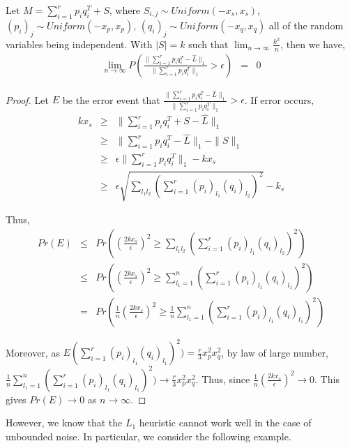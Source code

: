 \begin{prop}
Let $M=\sum_{i=1}^{r}p_{i}q_{i}^{T}+S$, where $S_{i,j}\sim Uniform(-x_{s},x_{s})$,
$(p_{i})_{j}\sim Uniform(-x_{p},x_{p})$, $(q_{i})_{j}\sim Uniform(-x_{q},x_{q})$
all of the random variables being independent. With $|S|=k$ such that
$\lim_{n\to\infty}\frac{k^{2}}{n}$, then we have,
\begin{eqnarray*}
\lim_{n\to\infty}P(\frac{\|\sum_{i=1}^{r}p_{i}q_{i}^{T}-\hat{L}\|_{1}}{\|\sum_{i=1}^{r}p_{i}q_{i}^{T}\|_{1}}>\epsilon) & = & 0
\end{eqnarray*}
\end{prop}
\begin{proof}
Let $E$ be the error event that $\frac{\|\sum_{i=1}^{r}p_{i}q_{i}^{T}-\hat{L}\|_{1}}{\|\sum_{i=1}^{r}p_{i}q_{i}^{T}\|_{1}}>\epsilon$.
If error occurs,
\begin{eqnarray*}
kx_{s} & \ge & \|\sum_{i=1}^{r}p_{i}q_{i}^{T}+S-\hat{L}\|_{1}\\
 & \ge & \|\sum_{i=1}^{r}p_{i}q_{i}^{T}-\hat{L}\|_{1}-\|S\|_{1}\\
 & \ge & \epsilon\|\sum_{i=1}^{r}p_{i}q_{i}^{T}\|_{1}-kx_{s}\\
 & \ge & \epsilon\sqrt{\sum_{l_{1}l_{2}}(\sum_{i=1}^{r}(p_{i})_{l_{1}}(q_{i})_{l_{2}})^{2}}-k_{s}
\end{eqnarray*}


Thus,
\begin{eqnarray*}
Pr(E)
&\le & Pr((\frac{2kx_{s}}{\epsilon})^{2}\ge\sum_{l_{1}l_{2}}(\sum_{i=1}^{r}(p_{i})_{l_{1}}(q_{i})_{l_{2}})^{2})\\
&\le & Pr((\frac{2kx_{s}}{\epsilon})^{2}\ge\sum_{l_{1}=1}^{n}(\sum_{i=1}^{r}(p_{i})_{l_{1}}(q_{i})_{l_{1}})^{2})\\
&= & Pr(\frac{1}{n}(\frac{2kx_{s}}{\epsilon})^{2}\ge\frac{1}{n}\sum_{l_{1}=1}^{n}(\sum_{i=1}^{r}(p_{i})_{l_{1}}(q_{i})_{l_{1}})^{2})
\end{eqnarray*}


Moreover, as $E(\sum_{i=1}^{r}(p_{i})_{l_{1}}(q_{i})_{l_{1}})^{2})=\frac{r}{3}x_{p}^{2}x_{q}^{2}$,
by law of large number, $\frac{1}{n}\sum_{l_{1}=1}^{n}(\sum_{i=1}^{r}(p_{i})_{l_{1}}(q_{i})_{l_{1}})^{2})\to\frac{r}{3}x_{p}^{2}x_{q}^{2}$.
Thus, since $\frac{1}{n}(\frac{2kx_{s}}{\epsilon})^{2}\to0$. This
gives $Pr(E)\to0$ as $n\to\infty$.
\end{proof}

However, we know that the $L_1$ heuristic cannot work well in the case of unbounded noise. In particular, we consider the following example. 

